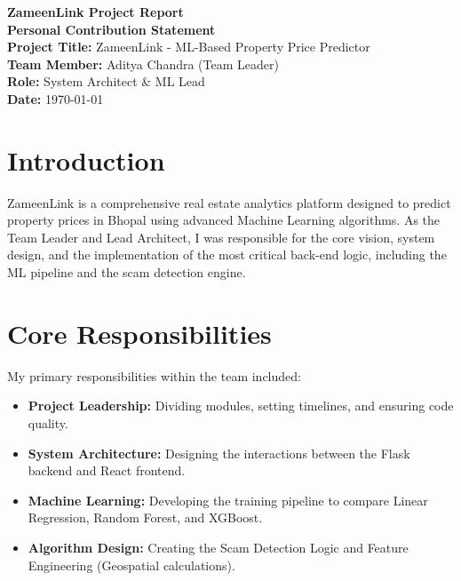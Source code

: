 \documentclass[12pt, a4paper]{article}
\begin{document}
\begin{titlepage}
    \centering
    \vspace*{2cm}
    {\Huge \textbf{ZameenLink Project Report}}\\[1.5cm]
    {\Large \textbf{Personal Contribution Statement}}\\[1cm]
    
    \textbf{Project Title:} ZameenLink - ML-Based Property Price Predictor\\
    \textbf{Team Member:} Aditya Chandra (Team Leader)\\
    \textbf{Role:} System Architect \& ML Lead\\
    \textbf{Date:} \today\\[3cm]
    
    \begin{abstract}
        This document details the contributions of Aditya Chandra to the ZameenLink project. It covers the system architecture design, machine learning model development, scam detection algorithms, and overall project orchestration.
    \end{abstract}
    
    \vfill
\end{titlepage}

\tableofcontents
\newpage

\section{Introduction}
ZameenLink is a comprehensive real estate analytics platform designed to predict property prices in Bhopal using advanced Machine Learning algorithms. As the Team Leader and Lead Architect, I was responsible for the core vision, system design, and the implementation of the most critical back-end logic, including the ML pipeline and the scam detection engine.

\section{Core Responsibilities}
My primary responsibilities within the team included:
\begin{itemize}
    \item \textbf{Project Leadership:} Dividing modules, setting timelines, and ensuring code quality.
    \item \textbf{System Architecture:} Designing the interactions between the Flask backend and React frontend.
    \item \textbf{Machine Learning:} Developing the training pipeline to compare Linear Regression, Random Forest, and XGBoost.
    \item \textbf{Algorithm Design:} Creating the Scam Detection Logic and Feature Engineering (Geospatial calculations).
\end{itemize}
\end{document}
